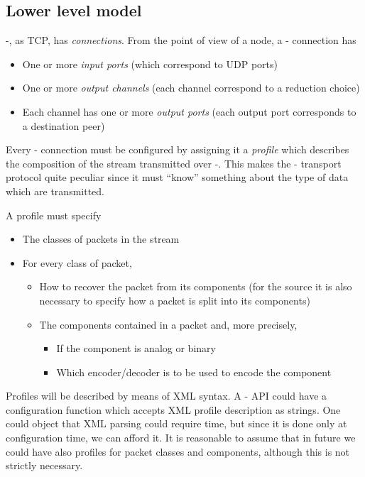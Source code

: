 \documentclass{article}
\begin{document}
\subsection{Lower level model}
\label{sub:2.0;transport_layer}

\medusa-, as TCP, has \emph{connections}.  From the point of view of a
node, a \medusa- connection has 

\begin{itemize}
  \item
    One or more \emph{input ports} (which correspond to UDP ports)
  \item
    One or more \emph{output channels} (each channel correspond to a
    reduction choice)
  \item
    Each channel has one or more \emph{output ports} (each output port
    corresponds to a destination peer)
\end{itemize}
%
Every \medusa- connection must be configured by assigning it a
\emph{profile} which describes the composition of the stream
transmitted over \medusa-.  This makes the \medusa- transport protocol
quite peculiar since it must ``know'' something about the type of data
which are transmitted.

A profile must specify

\begin{itemize}
  \item 
    The classes of packets in the stream
  \item
    For every class of packet, 
    \begin{itemize}
      \item
        How to recover the packet from its components (for the source
        it is also necessary to specify how a packet is split into its
        components) 
      \item
        The components contained in a packet
        and, more precisely,
        \begin{itemize}
          \item
            If the component is analog or binary
          \item
            Which encoder/decoder is to be used to encode the component
        \end{itemize}
    \end{itemize}
\end{itemize}
%
Profiles will be described by means of XML syntax.  A \medusa- API
could have a configuration function which accepts XML profile
description as strings.  One could object that XML parsing could
require time, but since it is done only at configuration time, we can
afford it.  It is reasonable to assume that in future we could have
also profiles for packet classes and components, although this is not
strictly necessary.
\end{document}
